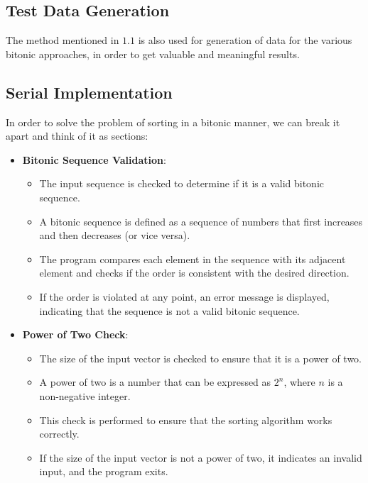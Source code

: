 \subsection{Test Data Generation}
The method mentioned in $1.1$ is also used for generation of data for the various bitonic approaches, in order to get valuable and meaningful results.

\subsection{Serial Implementation}
In order to solve the problem of sorting in a bitonic \cite{bitonic1980} manner, we can break it apart and think of it as sections:

\begin{itemize}
  \item \textbf{Bitonic Sequence Validation}:
  \begin{itemize}
    \item The input sequence is checked to determine if it is a valid bitonic sequence.
    \item A bitonic sequence is defined as a sequence of numbers that first increases and then decreases (or vice versa).
    \item The program compares each element in the sequence with its adjacent element and checks if the order is consistent with the desired direction.
    \item If the order is violated at any point, an error message is displayed, indicating that the sequence is not a valid bitonic sequence.
  \end{itemize}
  
  \item \textbf{Power of Two Check}:
  \begin{itemize}
    \item The size of the input vector is checked to ensure that it is a power of two.
    \item A power of two is a number that can be expressed as $2^n$, where $n$ is a non-negative integer.
    \item This check is performed to ensure that the sorting algorithm works correctly.
    \item If the size of the input vector is not a power of two, it indicates an invalid input, and the program exits.
  \end{itemize}

  \newpage
  

\end{itemize}
